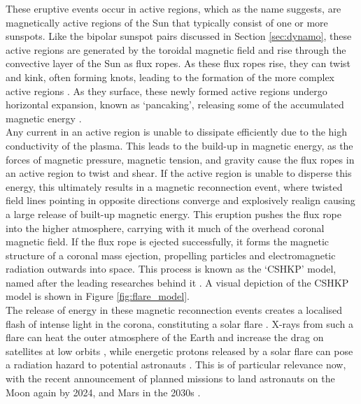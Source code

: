\documentclass[11pt,a4paper,onecolumn]{report}
\begin{document}
These eruptive events occur in active regions, which as the name
suggests, are magnetically active regions of the Sun that typically consist of
one or more sunspots. Like the bipolar sunspot pairs discussed in Section
\ref{sec:dynamo}, these active regions are generated by the toroidal magnetic
field and rise through the convective layer of the Sun as flux ropes. As these
flux ropes rise, they can twist and kink, often forming knots, leading to the
formation of the more complex active regions \citep{linton_helical_1996}. As they surface,
these newly formed active regions undergo horizontal expansion, known as `pancaking',
releasing some of the accumulated magnetic energy
\citep{toriumi_flare-productive_2019}.\\

Any current in an active region is unable to dissipate efficiently due to
the high conductivity of the plasma. This leads to the build-up in magnetic energy, as the
forces of magnetic pressure, magnetic tension, and gravity cause the flux ropes
in an active region to twist and shear. If the active region is unable to disperse this energy, this
ultimately results in a magnetic reconnection event, where twisted field lines
pointing in opposite directions converge and explosively realign causing a large
release of built-up magnetic energy. This eruption
pushes the flux rope into the higher atmosphere, carrying with it much of the
overhead coronal magnetic field. If the flux rope is ejected successfully, it
forms the magnetic structure of a coronal mass ejection, propelling particles and electromagnetic
radiation outwards into space. This process is known as the `CSHKP' model, named after
the leading researches behind it \citep{carmichael_process_1964,
sturrock_model_1966, hirayama_theoretical_1974, kopp_magnetic_1976}. A visual
depiction of the CSHKP model is shown in Figure \ref{fig:flare_model}. \\


The release of energy in these magnetic reconnection events creates a localised
flash of intense light in the corona, constituting a solar flare
\citep{priest_solar_1984}. X-rays from such a flare can heat the outer
atmosphere of the Earth and increase the drag on satellites at low orbits
\citep{Oliveira2019}, while energetic protons released by a solar flare can
pose a radiation hazard to potential astronauts \citep{Mewaldt2005,
lamarche1996}. This is of particular relevance now, with the recent announcement
of planned missions to land astronauts on the Moon again by 2024, and Mars in
the 2030s \citep{smith_artemis_2020}. \\
\end{document}
